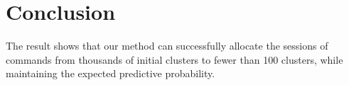 \chapter{Conclusion}
The result shows that our method can successfully allocate the sessions of commands
from thousands of initial clusters to fewer than 100 clusters,
while maintaining the expected predictive probability.
